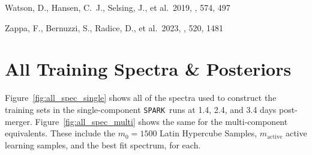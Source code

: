 \documentclass[twocolumn,twocolappendix]{aastex63}
\def\SPARK{\texttt{SPARK}}
\begin{document}
{\begin{thebibliography}{}




 Watson, D., Hansen, C.~J., Selsing, J., et al.\ 2019, \nat, 574, 497













 Zappa, F., Bernuzzi, S., Radice, D., et al.\ 2023, \mnras, 520, 1481





\end{thebibliography}


\appendix{}

\section{All Training Spectra \& Posteriors}\label{app:allspec_posteriors}

Figure~\ref{fig:all_spec_single} shows all of the spectra used to construct the training sets in the single-component \SPARK~runs at 1.4, 2.4, and 3.4 days post-merger. Figure~\ref{fig:all_spec_multi} shows the same for the multi-component equivalents. These include the $m_0 = 1500$ Latin Hypercube Samples, $m_{\mathrm{active}}$ active learning samples, and the best fit spectrum, for each.

}
\end{document}
